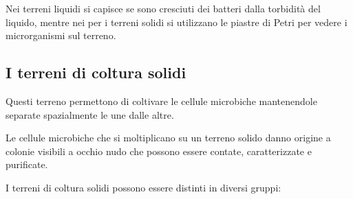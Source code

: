 \documentclass[11pt]{book}
\begin{document}
Nei terreni liquidi si capisce se sono cresciuti dei batteri dalla torbidità del liquido, mentre nei per i terreni solidi si utilizzano le piastre di Petri per vedere i microrganismi sul terreno.

\subsection{I terreni di coltura solidi}
Questi terreno permettono di coltivare le cellule microbiche mantenendole separate spazialmente le une dalle altre.

Le cellule microbiche che si moltiplicano su un terreno solido danno origine a colonie visibili a occhio nudo che possono essere contate, caratterizzate e purificate.

I terreni di coltura solidi possono essere distinti in diversi gruppi:
\end{document}
